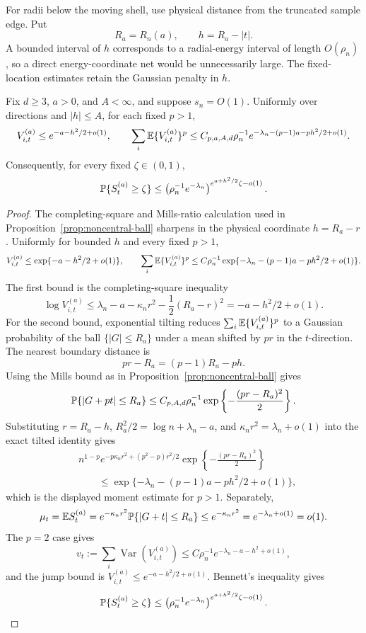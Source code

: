 For radii below the moving shell, use physical distance from the truncated
sample edge. Put
\[
    R_a=R_n(a),\qquad h=R_a-|t|.
\]
A bounded interval of \(h\) corresponds to a radial-energy interval of length
\(O(\rho_n)\), so a direct energy-coordinate net would be unnecessarily large.
The fixed-location estimates retain the Gaussian penalty in \(h\).
\begin{lemma}
\label{lem:physical-offset-fixed-t}
Fix \(d\ge3\), \(a>0\), and \(A<\infty\), and suppose \(s_n=O(1)\).
Uniformly over directions and \(|h|\le A\), for each fixed \(p>1\),
\[
 V_{i,t}^{(a)}\le e^{-a-h^2/2+o(1)},\qquad
 \sum_i\mathbb E\{V_{i,t}^{(a)}\}^p
 \le C_{p,a,A,d}\rho_n^{-1}
 e^{-\lambda_n-(p-1)a-ph^2/2+o(1)}.
\]
Consequently, for every fixed \(\zeta\in(0,1)\),
\[
 \mathbb P\{S_t^{(a)}\ge\zeta\}
 \le \left(\rho_n^{-1}e^{-\lambda_n}\right)^{
 e^{a+h^2/2}\zeta-o(1)}.
\]
\end{lemma}

\begin{proof}
The completing-square and Mills-ratio calculation used in
Proposition~\ref{prop:noncentral-ball} sharpens in the physical coordinate
\(h=R_a-r\).  Uniformly for bounded \(h\) and every fixed \(p>1\),
\[
    V_{i,t}^{(a)}\le \exp\{-a-h^2/2+o(1)\},
    \qquad
    \sum_i\mathbb E\{V_{i,t}^{(a)}\}^p
    \le
    C\rho_n^{-1}\exp\{-\lambda_n-(p-1)a-ph^2/2+o(1)\}.
\]
The first bound is the completing-square inequality
\[
    \log V_{i,t}^{(a)}
    \le
    \lambda_n-a-\kappa_nr^2-\frac12(R_a-r)^2
    =
    -a-h^2/2+o(1).
\]
For the second bound, exponential tilting reduces
\(\sum_i\mathbb E\{V_{i,t}^{(a)}\}^p\) to a Gaussian probability of the ball
\(\{|G|\le R_a\}\) under a mean shifted by \(pr\) in the \(t\)-direction.
The nearest boundary distance is
\[
    pr-R_a=(p-1)R_a-ph.
\]
Using the Mills bound as in Proposition~\ref{prop:noncentral-ball} gives
\[
    \mathbb P\{|G+pt|\le R_a\}
    \le
    C_{p,A,d}\rho_n^{-1}
    \exp\left\{-\frac{(pr-R_a)^2}{2}\right\}.
\]
Substituting \(r=R_a-h\), \(R_a^2/2=\log n+\lambda_n-a\), and
\(\kappa_nr^2=\lambda_n+o(1)\) into the exact tilted identity gives
\[
\begin{aligned}
&n^{1-p}e^{-p\kappa_nr^2+(p^2-p)r^2/2}
    \exp\left\{-\frac{(pr-R_a)^2}{2}\right\}  \\
&\qquad\le
    \exp\{-\lambda_n-(p-1)a-ph^2/2+o(1)\},
\end{aligned}
\]
which is the displayed moment estimate for \(p>1\).  Separately,
\[
    \mu_t=\mathbb E S_t^{(a)}
    =
    e^{-\kappa_nr^2}\mathbb P\{|G+t|\le R_a\}
    \le e^{-\kappa_nr^2}
    =
    e^{-\lambda_n+o(1)}
    =
    o(1).
\]
The \(p=2\) case gives
\[
    v_t:=\sum_i\operatorname{Var}(V_{i,t}^{(a)})
    \le C\rho_n^{-1}e^{-\lambda_n-a-h^2+o(1)},
\]
and the jump bound is \(V_{i,t}^{(a)}\le e^{-a-h^2/2+o(1)}\). Bennett's
inequality gives
\[
    \mathbb P\{S_t^{(a)}\ge\zeta\}
    \le
    \left(\rho_n^{-1}e^{-\lambda_n}\right)^{e^{a+h^2/2}\zeta-o(1)}.
\]
\end{proof}

